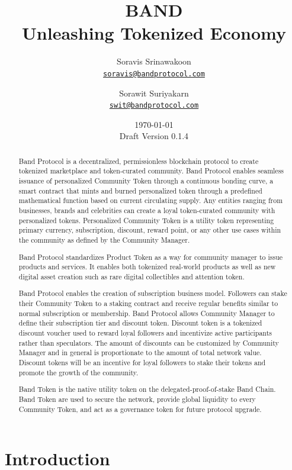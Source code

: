 \documentclass[letterpaper,11pt]{article}
\title{\LARGE BAND\\
    \Large Unleashing Tokenized Economy}
\author{
        Soravis Srinawakoon\\
        \small\href{mailto:soravis@bandprotocol.com}
            {\nolinkurl{soravis@bandprotocol.com}}
    \and
        Sorawit Suriyakarn\\
        \small\href{mailto:swit@bandprotocol.com}
            {\nolinkurl{swit@bandprotocol.com}}
    }
\date{\today\\\small Draft Version 0.1.4}
\begin{document}
\maketitle

\begin{abstract}

Band Protocol is a decentralized, permissionless blockchain protocol to create tokenized marketplace and token-curated community. Band Protocol enables seamless issuance of personalized Community Token through a continuous bonding curve, a smart contract that mints and burned personalized token through a predefined mathematical function based on current circulating supply. Any entities ranging from businesses, brands and celebrities can create a loyal token-curated community with personalized tokens. Personalized Community Token is a utility token representing primary currency, subscription, discount, reward point, or any other use cases within the community as defined by the Community Manager.

Band Protocol standardizes Product Token as a way for community manager to issue products and services. It enables both tokenized real-world products as well as new digital asset creation such as rare digital collectibles and attention token.

Band Protocol enables the creation of subscription business model. Followers can stake their Community Token to a staking contract and receive regular benefits similar to normal subscription or membership. Band Protocol allows Community Manager to define their subscription tier and discount token. Discount token is a tokenized discount voucher used to reward loyal followers and incentivize active participants rather than speculators. The amount of discounts can be customized by Community Manager and in general is proportionate to the amount of total network value. Discount tokens will be an incentive for loyal followers to stake their tokens and promote the growth of the community.

Band Token is the native utility token on the delegated-proof-of-stake Band Chain. Band Token are used to secure the network, provide global liquidity to every Community Token, and act as a governance token for future protocol upgrade.

\end{abstract}

\newpage
{
\hypersetup{linkcolor=black}
\tableofcontents
}
\newpage

\section{Introduction}
\end{document}
